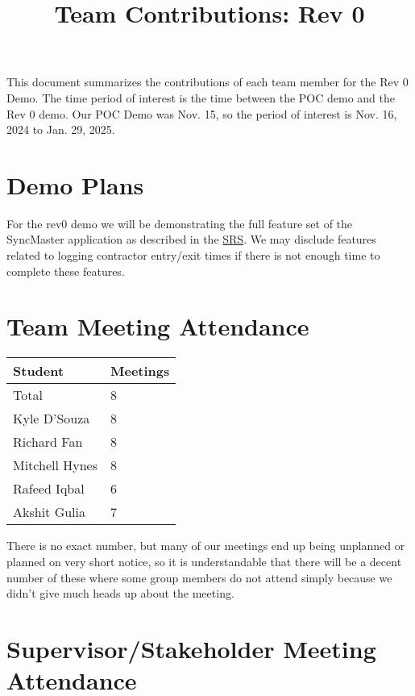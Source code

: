 \documentclass{article}
\title{Team Contributions: Rev 0\\\progname}
\author{\authname}
\date{}
\begin{document}
\maketitle

This document summarizes the contributions of each team member for the Rev 0
Demo.  The time period of interest is the time between the POC demo and the Rev
0 demo. Our POC Demo was Nov. 15, so the period of interest is Nov. 16, 2024 to
Jan. 29, 2025.

\section{Demo Plans}

For the rev0 demo we will be demonstrating the full feature set of
the SyncMaster application as described in the
\href{https://github.com/Spitgranger/SyncMaster/blob/main/docs/SRS-Volere/SRS.pdf}{SRS}.
We may disclude features related to logging contractor entry/exit
times if there is not enough time to complete these features.

\section{Team Meeting Attendance}

\begin{table}[H]
  \centering
  \begin{tabular}{ll}
    \toprule
    \textbf{Student} & \textbf{Meetings}\\
    \midrule
    Total & 8\\
    Kyle D'Souza & 8\\
    Richard Fan & 8\\
    Mitchell Hynes & 8\\
    Rafeed Iqbal & 6\\
    Akshit Gulia & 7\\
    \bottomrule
  \end{tabular}
\end{table}

There is no exact number, but many of our meetings end up being
unplanned or planned on very short notice, so it is understandable
that there will be a decent number of these where some group members
do not attend simply because we didn't give much heads up about the meeting.

\section{Supervisor/Stakeholder Meeting Attendance}
\end{document}
